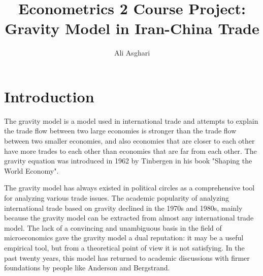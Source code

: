 \documentclass[12pt, letterpaper, twoside]{article}
\title{\textbf{Econometrics 2 Course Project:\\Gravity Model in Iran-China Trade}} %
\author{Ali Asghari } %
\affiliation{Shahid Beheshti University} %
\begin{document}
\maketitle



\vspace{2.5cm}


\thispagestyle{firstpage}

\pagebreak


\newgeometry{} %

\section{Introduction}
\label{sec:intro}
The gravity model is a model used in international trade and attempts to explain the trade flow between two large economies is stronger than the trade flow between two smaller economies, and also economies that are closer to each other have more trades to each other than economies that are far from each other. The gravity equation was introduced in 1962 by Tinbergen in his book "Shaping the World Economy".

The gravity model has always existed in political circles as a comprehensive tool for analyzing various trade issues. The academic popularity of analyzing international trade based on gravity declined in the 1970s and 1980s, mainly because the gravity model can be extracted from almost any international trade model. The lack of a convincing and unambiguous basis in the field of microeconomics gave the gravity model a dual reputation: it may be a useful empirical tool, but from a theoretical point of view it is not satisfying. In the past twenty years, this model has returned to academic discussions with firmer foundations by people like Anderson and Bergstrand.\cite{Bergeijk(2014)}
\end{document}
